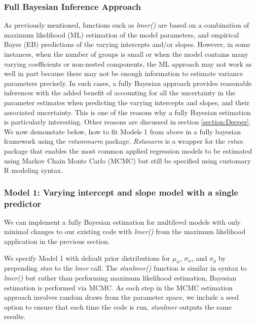 \subsubsection{Full Bayesian Inference Approach}
As previously mentioned, functions such as \textit{lmer()} are based on a combination of maximum likelihood (ML) estimation of the model parameters, and empirical Bayes (EB) predictions of the varying intercepts and/or slopes. However, in some instances, when the number of groups is small or when the model contains many varying coefficients or non-nested components, the ML approach may not work as well in part because there may not be enough information to estimate variance parameters precisely. In such cases, a fully Bayesian approach provides reasonable inferences with the added benefit of accounting for all the uncertainty in the parameter estimates when predicting the varying intercepts and slopes, and their associated uncertainty. This is one of the reasons why a fully Bayesian estimation is particularly interesting. Other reasons are discussed in section \ref{section:Deeper}. We now demonstate below, how to fit Models 1 from above in a fully bayesian framework using the \textit{rstammarm} package. \textit{Rstanarm} is a wrapper for the \textit{rstan} package that enables the most common applied regression models to be estimated using Markov Chain Monte Carlo (MCMC) but still be specified using customary R modeling syntax.

\subsubsection*{Model 1: Varying intercept and slope model with a single predictor}

We can implement a fully Bayesian estimation for multilevel models with only minimal changes to our existing code with \textit{lmer()} from the maximum likelihood application in the previous section. 

We specify Model 1 with default prior distributions for $\mu_{\alpha}$, $\sigma_{\alpha}$, and $\sigma_{y}$ by prepending \textit{stan\textunderscore} to the \textit{lmer} call. The \textit{stan\textunderscore lmer()} function is similar in syntax to \textit{lmer()} but rather than performing maximum likelihood estimation, Bayesian estimation is performed via MCMC. As each step in the MCMC estimation approach involves random draws from the parameter space, we include a seed option to ensure that each time the code is run, \textit{stan\textunderscore lmer} outputs the same results.


